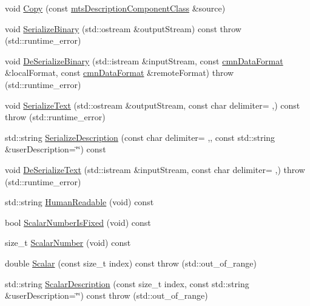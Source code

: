 \begin{DoxyCompactItemize}
\item 
void \hyperlink{classmts_description_component_class_a5523bbfb439a4ccfbd8287dfb0b6a36c}{Copy} (const \hyperlink{classmts_description_component_class}{mts\+Description\+Component\+Class} \&source)
\item 
void \hyperlink{classmts_description_component_class_a3b475eb7a270a3b8a7b97235b039118c}{Serialize\+Binary} (std\+::ostream \&output\+Stream) const   throw (std\+::runtime\+\_\+error)
\item 
void \hyperlink{classmts_description_component_class_ac38c93369c3e29bf8b8cc82e70ed205d}{De\+Serialize\+Binary} (std\+::istream \&input\+Stream, const \hyperlink{classcmn_data_format}{cmn\+Data\+Format} \&local\+Format, const \hyperlink{classcmn_data_format}{cmn\+Data\+Format} \&remote\+Format)  throw (std\+::runtime\+\_\+error)
\item 
void \hyperlink{classmts_description_component_class_a81e50daceabb34ec90c26c3f40219dd0}{Serialize\+Text} (std\+::ostream \&output\+Stream, const char delimiter= \textquotesingle{},\textquotesingle{}) const   throw (std\+::runtime\+\_\+error)
\item 
std\+::string \hyperlink{classmts_description_component_class_aa15b49ff92c3f2e129b4d123df42c305}{Serialize\+Description} (const char delimiter= \textquotesingle{},\textquotesingle{}, const std\+::string \&user\+Description=\char`\"{}\char`\"{}) const 
\item 
void \hyperlink{classmts_description_component_class_a1f6b20c2466c540e86555c93a57a87d0}{De\+Serialize\+Text} (std\+::istream \&input\+Stream, const char delimiter= \textquotesingle{},\textquotesingle{})  throw (std\+::runtime\+\_\+error)
\item 
std\+::string \hyperlink{classmts_description_component_class_a9f7f4fdc47b4c68703ffa12198abd055}{Human\+Readable} (void) const 
\item 
bool \hyperlink{classmts_description_component_class_a5949e16c6e792b1a0374f1dc22386080}{Scalar\+Number\+Is\+Fixed} (void) const 
\item 
size\+\_\+t \hyperlink{classmts_description_component_class_ac2d23b28060d28d94e704c2d510104d2}{Scalar\+Number} (void) const 
\item 
double \hyperlink{classmts_description_component_class_adb3e64dfa6d66a1d5f93e2ccefc4a7a8}{Scalar} (const size\+\_\+t index) const   throw (std\+::out\+\_\+of\+\_\+range)
\item 
std\+::string \hyperlink{classmts_description_component_class_aad7a72ad373e0c6cf4be445a658db6a1}{Scalar\+Description} (const size\+\_\+t index, const std\+::string \&user\+Description=\char`\"{}\char`\"{}) const   throw (std\+::out\+\_\+of\+\_\+range)
\end{DoxyCompactItemize}
